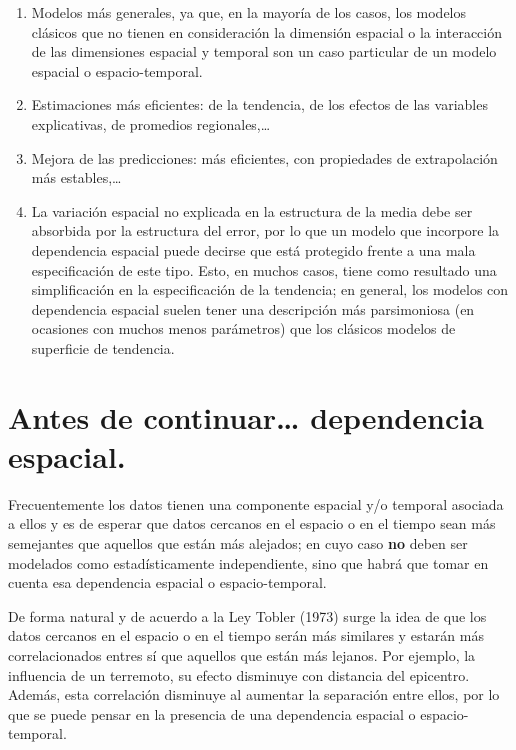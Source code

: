 \documentclass[
]{report}
\theoremstyle{definition}
\theoremstyle{definition}
\theoremstyle{definition}
\theoremstyle{definition}
\theoremstyle{remark}
\begin{document}
\begin{enumerate}
\def\labelenumi{\arabic{enumi}.}
\item
  Modelos más generales, ya que, en la mayoría de los casos, los modelos
  clásicos que no tienen en consideración la dimensión espacial o la
  interacción de las dimensiones espacial y temporal son un caso particular de
  un modelo espacial o espacio-temporal.
\item
  Estimaciones más eficientes: de la tendencia, de los efectos de las
  variables explicativas, de promedios regionales,\ldots{}
\item
  Mejora de las predicciones: más eficientes, con propiedades de extrapolación
  más estables,\ldots{}
\item
  La variación espacial no explicada en la estructura de la media debe ser
  absorbida por la estructura del error, por lo que un modelo que incorpore la
  dependencia espacial puede decirse que está protegido frente a una mala
  especificación de este tipo. Esto, en muchos casos, tiene como resultado una
  simplificación en la especificación de la tendencia; en general, los modelos
  con dependencia espacial suelen tener una descripción más parsimoniosa (en
  ocasiones con muchos menos parámetros) que los clásicos modelos de
  superficie de tendencia.
\end{enumerate}

\hypertarget{antes-de-continuar-dependencia-espacial.}{%
\section{Antes de continuar\ldots{} dependencia espacial.}\label{antes-de-continuar-dependencia-espacial.}}

Frecuentemente los datos tienen una componente espacial y/o temporal asociada a
ellos y es de esperar que datos cercanos en el espacio o en el tiempo sean más
semejantes que aquellos que están más alejados; en cuyo caso \textbf{no} deben ser
modelados como estadísticamente independiente, sino que habrá que tomar en
cuenta esa dependencia espacial o espacio-temporal.

De forma natural y de acuerdo a la Ley Tobler (1973) surge la idea de que los
datos cercanos en el espacio o en el tiempo serán más similares y estarán más
correlacionados entres sí que aquellos que están más lejanos. Por ejemplo, la
influencia de un terremoto, su efecto disminuye con distancia del epicentro.
Además, esta correlación disminuye al aumentar la separación entre ellos, por lo
que se puede pensar en la presencia de una dependencia espacial o
espacio-temporal.
\end{document}
